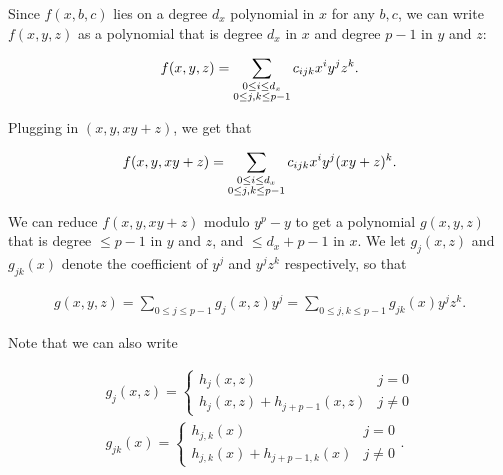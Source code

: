 \documentclass[10pt,a4paper]{article}
\begin{document}
Since $f(x,b,c)$ lies on a degree $d_{x}$ polynomial in $x$ for any $b,c$, we can write $f(x,y,z)$ as a polynomial that is degree $d_{x}$ in $x$ and degree $p-1$ in $y$ and $z$:\par


\[\begin{gathered}
f(x,y,z)=\sum_{\begin{subarray}{c}0\leq i\leq d_{x}\\
0\leq j,k\leq p-1\end{subarray}}c_{ijk}x^{i}y^{j}z^{k}.
\end{gathered}\]




Plugging in $(x,y,xy+z)$, we get that\par


\[\begin{gathered}
f(x,y,xy+z)=\sum_{\begin{subarray}{c}0\leq i\leq d_{x}\\
0\leq j,k\leq p-1\end{subarray}}c_{ijk}x^{i}y^{j}(xy+z)^{k}.
\end{gathered}\]


We can reduce $f(x,y,xy+z)$ modulo $y^{p}-y$ to get a polynomial $g(x,y,z)$ that is degree $\leq p-1$ in $y$ and $z$, and $\leq d_{x}+p-1$ in $x$. We let $g_{j}(x,z)$ and $g_{jk}(x)$ denote the coefficient of $y^{j}$ and $y^{j}z^{k}$ respectively, so that\par


\[\begin{gathered}
g(x,y,z)=\sum_{0\leq j\leq p-1}g_{j}(x,z)y^{j}=\sum_{0\leq j,k\leq p-1}g_{jk}(x)y^{j}z^{k}.
\end{gathered}\]


Note that we can also write\par


\[\begin{gathered}
\displaystyle g_{j}(x,z) \displaystyle=\begin{cases}h_{j}(x,z)&j=0\\
h_{j}(x,z)+h_{j+p-1}(x,z)&j\not=0\end{cases} \\
\displaystyle g_{jk}(x) \displaystyle=\begin{cases}h_{j,k}(x)&j=0\\
h_{j,k}(x)+h_{j+p-1,k}(x)&j\not=0\end{cases}.
\end{gathered}\]
\end{document}
